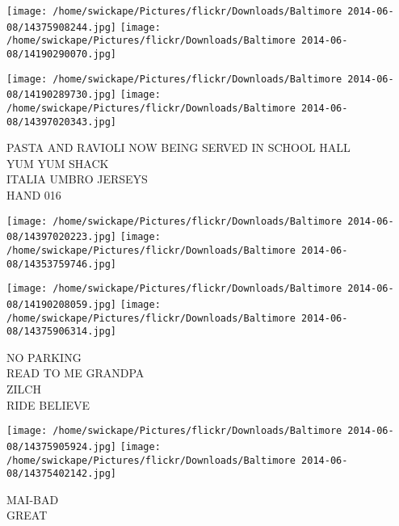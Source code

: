 \documentclass[10pt,letterpaper]{article}
\begin{document}
\texttt{[image: /home/swickape/Pictures/flickr/Downloads/Baltimore 2014-06-08/14375908244.jpg]}
\texttt{[image: /home/swickape/Pictures/flickr/Downloads/Baltimore 2014-06-08/14190290070.jpg]}

\texttt{[image: /home/swickape/Pictures/flickr/Downloads/Baltimore 2014-06-08/14190289730.jpg]}
\texttt{[image: /home/swickape/Pictures/flickr/Downloads/Baltimore 2014-06-08/14397020343.jpg]}

PASTA AND RAVIOLI NOW BEING SERVED IN SCHOOL HALL\\
YUM YUM SHACK\\
ITALIA UMBRO JERSEYS\\
HAND 016\\
\pagebreak

\texttt{[image: /home/swickape/Pictures/flickr/Downloads/Baltimore 2014-06-08/14397020223.jpg]}
\texttt{[image: /home/swickape/Pictures/flickr/Downloads/Baltimore 2014-06-08/14353759746.jpg]}

\texttt{[image: /home/swickape/Pictures/flickr/Downloads/Baltimore 2014-06-08/14190208059.jpg]}
\texttt{[image: /home/swickape/Pictures/flickr/Downloads/Baltimore 2014-06-08/14375906314.jpg]}

NO PARKING\\
READ TO ME GRANDPA\\
ZILCH\\
RIDE BELIEVE\\
\pagebreak

\texttt{[image: /home/swickape/Pictures/flickr/Downloads/Baltimore 2014-06-08/14375905924.jpg]}
\texttt{[image: /home/swickape/Pictures/flickr/Downloads/Baltimore 2014-06-08/14375402142.jpg]}

MAI{-}BAD\\
GREAT\\
\pagebreak
\end{document}
